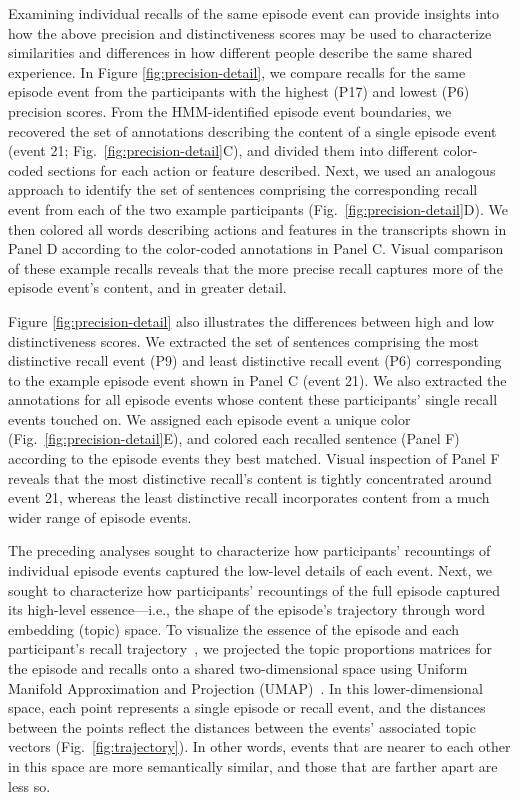 \documentclass[10pt]{article}
\begin{document}
Examining individual recalls of the same episode event can provide insights into how the above precision and distinctiveness scores may be used to characterize similarities and differences in how different people describe the same shared experience.  In Figure \ref{fig:precision-detail}, we compare recalls for the same episode event from the participants with the highest (P17) and lowest (P6) precision scores.  From the HMM-identified episode event boundaries, we recovered the set of annotations describing the content of a single episode event (event 21; Fig.~\ref{fig:precision-detail}C), and divided them into different color-coded sections for each action or feature described.  Next, we used an analogous approach to identify the set of sentences comprising the corresponding recall event from each of the two example participants (Fig.~\ref{fig:precision-detail}D).  We then colored all words describing actions and features in the transcripts shown in Panel D according to the color-coded annotations in Panel C.  Visual comparison of these example recalls reveals that the more precise recall captures more of the episode event's content, and in greater detail.

Figure \ref{fig:precision-detail} also illustrates the differences between high and low distinctiveness scores.  We extracted the set of sentences comprising the most distinctive recall event (P9) and least distinctive recall event (P6) corresponding to the example episode event shown in Panel C (event 21).  We also extracted the annotations for all episode events whose content these participants' single recall events touched on.  We assigned each episode event a unique color (Fig.~\ref{fig:precision-detail}E), and colored each recalled sentence (Panel F) according to the episode events they best matched.  Visual inspection of Panel F reveals that the most distinctive recall's content is tightly concentrated around event 21, whereas the least distinctive recall incorporates content from a much wider range of episode events.

The preceding analyses sought to characterize how participants' recountings of individual episode events captured the low-level details of each event.  Next, we sought to characterize how participants' recountings of the full episode captured its high-level essence---i.e., the shape of the episode's trajectory through word embedding (topic) space.  To visualize the essence of the episode and each participant's recall trajectory~\citep{HeusEtal18a}, we projected the topic proportions matrices for the episode and recalls onto a shared two-dimensional space using Uniform Manifold Approximation and Projection (UMAP)~\citep{McInEtal18}.  In this lower-dimensional space, each point represents a single episode or recall event, and the distances between the points reflect the distances between the events' associated topic vectors (Fig.~\ref{fig:trajectory}). In other words, events that are nearer to each other in this space are more semantically similar, and those that are farther apart are less so.
\end{document}
